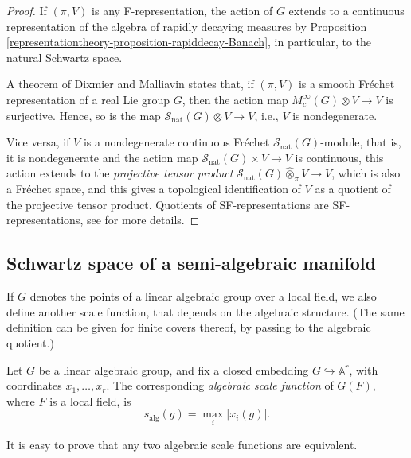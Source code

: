 \begin{proof}
 If $(\pi, V)$ is any F-representation, the action of $G$ extends to a continuous representation of the algebra of rapidly decaying measures by Proposition \ref{representationtheory-proposition-rapiddecay-Banach}, in particular, to the natural Schwartz space. 

 A theorem of Dixmier and Malliavin \cite{Dixmier-Malliavin} states that, if $(\pi,V)$ is a smooth Fr\'echet representation of a real Lie group $G$, then the action map $M_c^\infty(G) \otimes V \to V$ is surjective. Hence, so is the map $\mathcal S_{\text{nat}}(G)\otimes V \to V$, i.e., $V$ is nondegenerate. 
 
 Vice versa, if $V$ is a nondegenerate continuous Fr\'echet $\mathcal S_{\text{nat}}(G)$-module, that is, it is nondegenerate and the action map $\mathcal S_{\text{nat}}(G) \times V\to V$ is continuous, this action extends to the \emph{projective tensor product} $\mathcal S_{\text{nat}}(G) \hat\otimes_\pi V \to V$, which is also a Fr\'echet space, and this gives a topological identification of $V$ as a quotient of the projective tensor product. Quotients of SF-representations are SF-representations, see \cite[Lemma 2.9 and Proposition 2.20]{Bernstein-Kroetz} for more details. 
\end{proof}





\subsection{Schwartz space of a semi-algebraic manifold}
\label{subsection-Schwartz-algebraic}

If $G$ denotes the points of a linear algebraic group over a local field, we also define another scale function, that depends on the algebraic structure. (The same definition can be given for finite covers thereof, by passing to the algebraic quotient.)

\begin{definition}
 \label{definition-algebraic-scale}
Let $G$ be a linear algebraic group, and fix a closed embedding $G\hookrightarrow \mathbb A^r$, with coordinates $x_1, \dots, x_r$. The corresponding {\it algebraic scale function} of $G(F)$, where $F$ is a local field, is 
$$s_{\text{alg}} (g) = \max_i |x_i(g)|.$$
\end{definition}

It is easy to prove that any two algebraic scale functions are equivalent.

